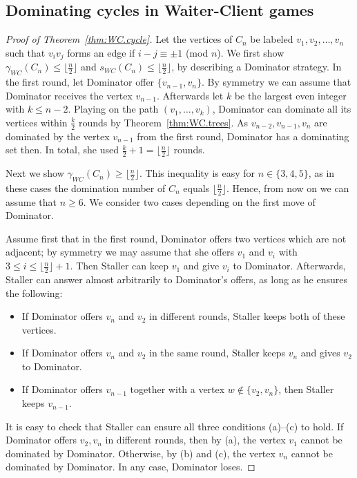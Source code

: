 \documentclass[reqno, 12pt]{amsart}
\numberwithin{equation}{section}
\numberwithin{figure}{section}
\begin{document}
\subsection{Dominating cycles in Waiter-Client games}

\begin{proof}[Proof of Theorem~\ref{thm:WC.cycle}]
Let the vertices of $C_n$ be labeled $v_1,v_2,\ldots,v_n$
such that $v_iv_j$ forms an edge if $i-j \equiv \pm 1$ (mod $n$).
We first show $\gamma_{WC}(C_n)\leq \lfloor \frac{n}{2} \rfloor$ and $s_{WC}(C_n)\leq \lfloor \frac{n}{2} \rfloor$, by describing a Dominator strategy. In the first round, let Dominator offer $\{v_{n-1},v_n\}$. By symmetry we can assume that Dominator receives the vertex $v_{n-1}$.
Afterwards let $k$ be the largest even integer with $k\leq n-2$.
Playing on the path $(v_1,\ldots,v_k)$,
Dominator can dominate all its vertices within $\frac{k}{2}$ rounds
by Theorem~\ref{thm:WC.trees}. As $v_{n-2},v_{n-1},v_n$
are dominated by the vertex $v_{n-1}$ from the first round,
Dominator has a dominating set then. In total, she used
$\frac{k}{2}+1 = \lfloor \frac{n}{2} \rfloor$ rounds.

\smallskip

Next we show $\gamma_{WC}(C_n)\geq \lfloor \frac{n}{2} \rfloor$.
This inequality is easy for $n\in \{3,4,5\}$,
as in these cases the domination number of $C_n$ equals
$\lfloor \frac{n}{2} \rfloor$.
Hence, from now on we can assume that $n\geq 6$.
We consider two cases depending on the first move of Dominator.

Assume first that in the first round, Dominator offers two vertices which are not adjacent; by symmetry we may assume that she offers $v_1$ and
$v_i$ with $3\leq i\leq \lfloor \frac{n}{2} \rfloor +1 $. Then Staller can keep $v_1$ and give $v_i$ to Dominator.
Afterwards, Staller can answer almost arbitrarily to Dominator's offers, as long as he ensures the following:
\begin{itemize}
    \item[(a)] If Dominator offers $v_n$ and $v_2$ in different rounds,
      Staller keeps both of these vertices.    
    \item[(b)] If Dominator offers $v_n$ and $v_2$ in the same round,
      Staller keeps $v_n$ and gives $v_2$ to Dominator.
    \item[(c)] If Dominator offers $v_{n-1}$ together with a vertex $w\notin \{v_2,v_n\}$, then Staller keeps $v_{n-1}$.
\end{itemize}
It is easy to check that Staller can ensure all three conditions (a)--(c) to hold. If Dominator offers $v_2,v_n$ in different rounds, then by (a), the vertex $v_1$ cannot be dominated by Dominator.
Otherwise, by (b) and (c), the vertex $v_n$ cannot be dominated by Dominator. In any case, Dominator loses.


\end{proof}
\end{document}
